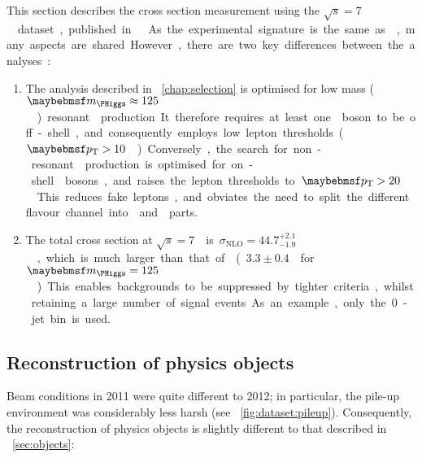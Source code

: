 
This section describes the \WW cross section measurement using the 
\unit{$\sqrt{s} = 7$}{\TeV} dataset, published in \Reference~\cite{WW-7TeV}.
As the experimental signature is the same as \HWW, many aspects are shared.
However, there are two key differences between the analyses: 

\begin{enumerate}
	\item The analysis described in \Chapter~\ref{chap:selection} is optimised for low 
	mass (\unit{$\mH \approx 125$}{\GeV}) resonant \WW production. It therefore requires 
	at least one \PW boson to be off-shell, and consequently employs low lepton 
	thresholds (\unit{$\pt > 10$}{\GeV}). Conversely, the search for non-resonant \WW 
	production is optimised for on-shell \PW bosons, and raises the lepton thresholds 
	to \unit{$\pt > 20$}{\GeV}. This reduces fake leptons, and obviates the need to split 
	the different flavour channel into \emch and \mech parts.

	\item The total \WW cross section at \unit{$\sqrt{s} = 7$}{\TeV} is 
	\unit{$\sigma_{\text{NLO}} = 44.7^{+2.1}_{-1.9}$}{\pico\barn}, which is much larger than 
	that of \ggHWW (\unit{$3.3 \pm 0.4$}{\pico\barn} for \unit{$\mH = 125$}{\GeV}). This 
	enables backgrounds to be suppressed by tighter criteria, whilst retaining a large number 
	of signal events. As an example, only the 0-jet bin is used.
\end{enumerate}



\subsection{Reconstruction of physics objects}

Beam conditions in 2011 were quite different to 2012; in particular, the pile-up 
environment was considerably less harsh (see \Figure~\ref{fig:dataset:pileup}). Consequently, 
the reconstruction of physics objects is slightly different to that described in 
\Section~\ref{sec:objects}:

